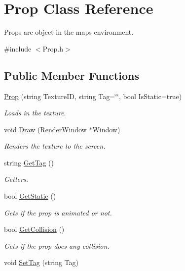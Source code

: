 \hypertarget{class_prop}{}\section{Prop Class Reference}
\label{class_prop}


Props are object in the maps environment.  




{\ttfamily \#include $<$Prop.\+h$>$}

\subsection*{Public Member Functions}
\begin{DoxyCompactItemize}
\item 
\hyperlink{class_prop_a1e207bb51ed3d92ec2c93d45dfcbcabf}{Prop} (string Texture\+ID, string Tag=\char`\"{}\char`\"{}, bool Is\+Static=true)
\begin{DoxyCompactList}\small\item\em Loads in the texture. \end{DoxyCompactList}\item 
void \hyperlink{class_prop_a55c4fb13383f6f5edc7b64066b0c2bc4}{Draw} (Render\+Window $\ast$Window)
\begin{DoxyCompactList}\small\item\em Renders the texture to the screen. \end{DoxyCompactList}\item 
string \hyperlink{class_prop_a1fdb0adb8f604a33f029bc24c66c9740}{Get\+Tag} ()
\begin{DoxyCompactList}\small\item\em Getters. \end{DoxyCompactList}\item 
bool \hyperlink{class_prop_a560525a45eae6c401f33cc699cbb7dec}{Get\+Static} ()
\begin{DoxyCompactList}\small\item\em Gets if the prop is animated or not. \end{DoxyCompactList}\item 
bool \hyperlink{class_prop_a7f1a501490f335812e0edc06ba3f9bcb}{Get\+Collision} ()
\begin{DoxyCompactList}\small\item\em Gets if the prop does any collision. \end{DoxyCompactList}\item 
void \hyperlink{class_prop_aa082e05be14b0d17d28e58edc5311099}{Set\+Tag} (string Tag)

\end{DoxyCompactItemize}

